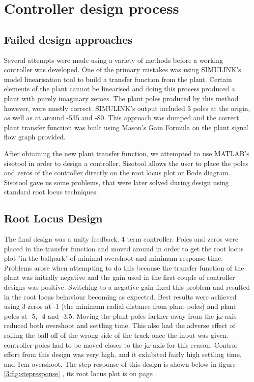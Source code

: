 \section{Controller design process}

\subsection{Failed design approaches}

Several attempts were made using a variety of methods before a working controller was developed. One of the primary mistakes was using SIMULINK's model linearisation tool to build a transfer function from the plant. Certain elements of the plant cannot be linearised and doing this process produced a plant with purely imaginary zeroes. The plant poles produced by this method however, were mostly correct. SIMULINK's output included 3 poles at the origin, as well as at around -535 and -80. This approach was dumped and the correct plant transfer function was built using Mason's Gain Formula on the plant signal flow graph provided.

After obtaining the new plant transfer function, we attempted to use MATLAB's sisotool in order to design a controller. Sisotool allows the user to place the poles and zeros of the controller directly on the root locus plot or Bode diagram. Sisotool gave us some problems, that were later solved during design using standard root locus techniques.

\subsection{Root Locus Design}


The final design was a unity feedback, 4 term controller. Poles and zeros were placed in the transfer function and moved around in order to get the root locus plot "in the ballpark" of minimal overshoot and minimum response time. Problems arose when attempting to do this because the transfer function of the plant was initially negative and the gain used in the first couple of controller designs was positive. Switching to a negative gain fixed this problem and resulted in the root locus behaviour becoming as expected. Best results were achieved using 3 zeros at -1 (the minimum radial distance from plant poles) and plant poles at -5, -4 and -3.5. Moving the plant poles farther away from the j$\omega$ axis reduced both overshoot and settling time. This also had the adverse effect of rolling the ball off of the wrong side of the track once the input was given. controller poles had to be moved closer to the j$\omega$ axis for this reason. Control effort from this design was very high, and it exhibited fairly high settling time, and 1cm overshoot. The step response of this design is shown below in figure  \ref{3:fig:stepresponse} , its root locus plot is on page \pageref{2:fig:rlocus}.

